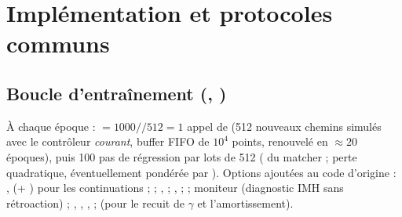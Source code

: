 \section{Implémentation et protocoles communs}
\label{app:impl}

\subsection{Boucle d'entraînement (, )}
À chaque époque :  $=1000//512=1$ appel de  (512 nouveaux chemins simulés avec le contrôleur \emph{courant}, buffer FIFO de $10^4$ points, renouvelé en $\approx20$ époques), puis 100 pas de régression par lots de 512 ( du matcher ; perte quadratique, éventuellement pondérée par ). Options ajoutées au code d'origine : ,  (+ ) pour les continuations ;  ; ,  ; ,  ;  ; moniteur  (diagnostic IMH sans rétroaction) ; , , ,  ;  (pour le recuit de $\gamma$ et l'amortissement).

